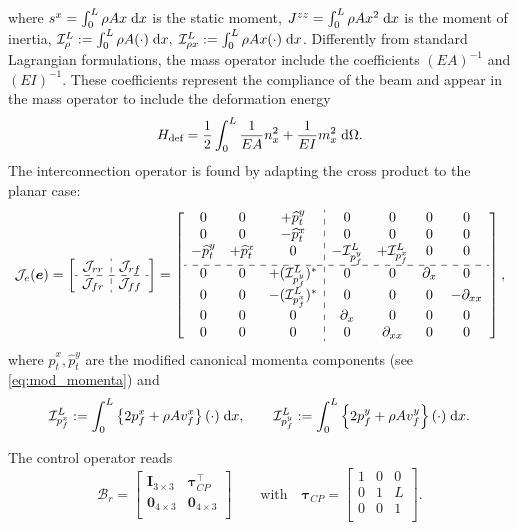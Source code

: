 where  $s^x = \int_{0}^{L} \rho A x \d{x}$ is the static moment, $J^{zz} = \int_{0}^{L} \rho A x^2 \d{x}$ is the moment of inertia, $\mathcal{I}_\rho^L := \int_{0}^L \rho A (\cdot) \d{x}, \; \mathcal{I}_{\rho x}^L := \int_{0}^L \rho A x (\cdot) \d{x}$. Differently from standard Lagrangian formulations, the mass operator include the coefficients $(EA)^{-1}$ and $(EI)^{-1}$. These coefficients represent the compliance of the beam and appear in the mass operator to include the deformation energy
	\begin{equation*}
	H_{\text{def}} = \frac{1}{2}\int_{0}^L \frac{1}{EA} n_x^2 + \frac{1}{EI} m_x^2  \d\Omega.
	\end{equation*}
The interconnection operator is found by adapting the cross product to the planar case:
\begin{equation}
\label{eq:EB_J}
\mathcal{J}_{e}(\bm{e}) = 
\left[ \begin{array}{c:c}
{\mathcal{J}}_{rr} & {\mathcal{J}}_{rf} \\
\hdashline
{\mathcal{J}}_{fr} & {\mathcal{J}}_{ff} \\
\end{array} \right] = 
\left[ \begin{array}{ccc:cccc}
0 & 0 & +\widehat{p}_t^y      & 0 & 0 & 0 & 0 \\
0 & 0 & -\widehat{p}_t^x     & 0 & 0 & 0 & 0 \\
-\widehat{p}_t^y & +\widehat{p}_t^x & 0 & -\mathcal{I}_{p_f^y}^{L} & +\mathcal{I}_{p_f^x}^{L} & 0 & 0 \\
\hdashline 
0 & 0 & +(\mathcal{I}_{p_f^y}^{L})^* & 0 & 0 & \partial_x & 0  \\
0 & 0 & -(\mathcal{I}_{p_f^x}^{L})^* & 0 & 0 & 0 & -\partial_{xx} \\
0 & 0 & 0 & \partial_{x} & 0 & 0 & 0 \\
0 & 0 & 0 & 0 & \partial_{xx} & 0 & 0 \\
\end{array} \right],
\end{equation}
where $\widehat{p}_t^x, \widehat{p}_t^y$ are the modified canonical momenta components (see \eqref{eq:mod_momenta}) and 
$$\mathcal{I}_{p_f^x}^{L} := \int_{0}^{L} \left\{2 p_f^x + \rho A v_f^x \right\} (\cdot) \d{x}, \qquad \mathcal{I}_{p_f^y}^{L} := \int_{0}^{L} \left\{2 p_f^y + \rho A v_f^y \right\} (\cdot) \d{x}.$$ 

The control operator reads
\begin{equation}
{\mathcal{B}}_r = \begin{bmatrix}
\bm{I}_{3\times 3} & \bm\tau_{CP}^\top \\
\bm{0}_{4\times 3} & \bm{0}_{4\times 3} \\
\end{bmatrix} \qquad \text{with} \quad
\bm\tau_{CP} = \begin{bmatrix}
1 & 0 & 0 \\
0 & 1 & L \\
0 & 0 & 1 \\
\end{bmatrix}.
\end{equation}

